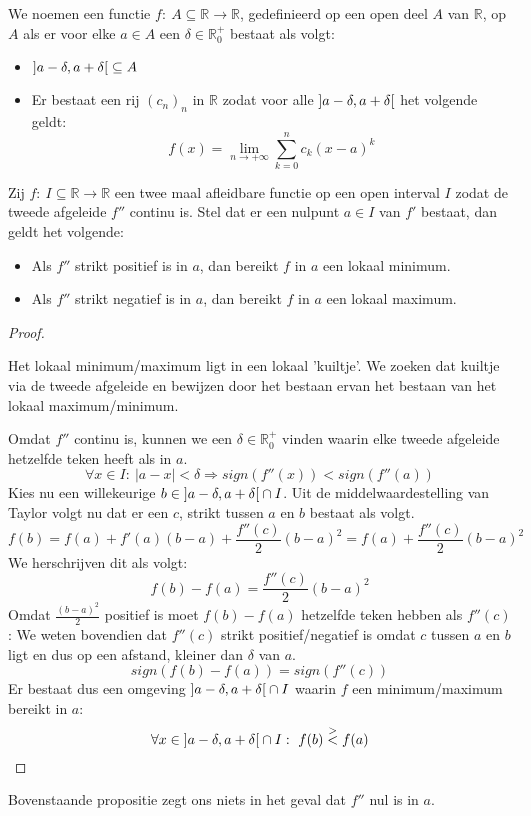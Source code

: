 \documentclass[main.tex]{subfiles}
\begin{document}
\begin{de}
  We noemen een functie $f:\ A \subseteq \mathbb{R} \rightarrow \mathbb{R}$, gedefinieerd op een open deel $A$ van $\mathbb{R}$,  op $A$ als er voor elke $a\in A$ een $\delta \in \mathbb{R}_{0}^{+}$ bestaat als volgt:
  \begin{itemize}
  \item $\interval[open]{a-\delta}{a+\delta} \subseteq A$
  \item Er bestaat een rij $(c_{n})_{n}$ in $\mathbb{R}$ zodat voor alle $\interval[open]{a-\delta}{a+\delta}$ het volgende geldt:
    \[ f(x) = \lim_{n\rightarrow +\infty}\sum_{k=0}^{n}c_{k}(x-a)^{k} \]  
  \end{itemize}
\end{de}

\begin{bpr}
  Zij $f:\ I \subseteq \mathbb{R} \rightarrow \mathbb{R}$ een twee maal afleidbare functie op een open interval $I$ zodat de tweede afgeleide $f''$ continu is.
  Stel dat er een nulpunt $a\in I$ van $f'$ bestaat, dan geldt het volgende:
  \begin{itemize}
  \item Als $f''$ strikt positief is in $a$, dan bereikt $f$ in $a$ een lokaal minimum.
  \item Als $f''$ strikt negatief is in $a$, dan bereikt $f$ in $a$ een lokaal maximum.
  \end{itemize}

  \begin{proof}
    \begin{idee}
      Het lokaal minimum/maximum ligt in een lokaal 'kuiltje'.
      We zoeken dat kuiltje via de tweede afgeleide en bewijzen door het bestaan ervan het bestaan van het lokaal maximum/minimum.
    \end{idee}
    
    Omdat $f''$ continu is, kunnen we een $\delta \in \mathbb{R}_{0}^{+}$ vinden waarin elke tweede afgeleide hetzelfde teken heeft als in $a$.
    \[ \forall x\in I:\ |a-x|< \delta \Rightarrow sign(f''(x)) < sign(f''(a)) \]
    Kies nu een willekeurige $b\in \interval[open]{a-\delta}{a+\delta} \cap I$.
    Uit de middelwaardestelling van Taylor volgt nu dat er een $c$, strikt tussen $a$ en $b$ bestaat als volgt.
    \[ f(b) = f(a) + f'(a)(b-a) + \frac{f''(c)}{2}(b-a)^{2} = f(a) + \frac{f''(c)}{2}(b-a)^{2} \]
    We herschrijven dit als volgt:
    \[ f(b)-f(a) =\frac{f''(c)}{2}(b-a)^{2} \]
    Omdat $\frac{(b-a)^{2}}{2}$ positief is moet $f(b)-f(a)$ hetzelfde teken hebben als $f''(c)$:
    We weten bovendien dat $f''(c)$ strikt positief/negatief is omdat $c$ tussen $a$ en $b$ ligt en dus op een afstand, kleiner dan $\delta$ van $a$.
    \[ sign(f(b)-f(a)) = sign(f''(c)) \]
    Er bestaat dus een omgeving $\interval[open]{a-\delta}{a+\delta} \cap I$ waarin $f$ een minimum/maximum bereikt in $a$:
    \[ \forall x \in \interval[open]{a-\delta}{a+\delta} \cap I:\ f(b) \overset{>}{<} f(a) \]

  \end{proof}
\end{bpr}

\begin{opm}
  Bovenstaande propositie zegt ons niets in het geval dat $f''$ nul is in $a$.
\end{opm}
\end{document}
